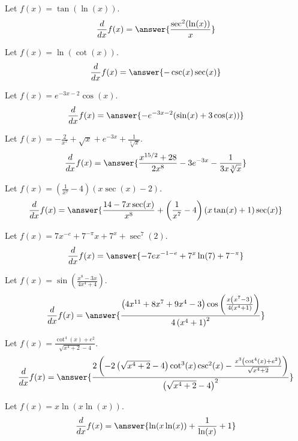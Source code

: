 \documentclass{ximera}
\begin{document}
\begin{shuffle}
\begin{exercise}
\begin{exercise}
Let $f(x)=\tan (\ln (x))$.
\[
\ddx f(x) = \answer{\frac{\sec ^2(\ln (x))}{x}}
\]
\end{exercise}

\begin{exercise}
Let $f(x)=\ln (\cot (x))$.
\[
\ddx f(x) = \answer{-\csc (x) \sec (x)}
\]
\end{exercise}

\begin{exercise}
Let $f(x)=e^{-3 x-2} \cos (x)$.
\[
\ddx f(x) = \answer{-e^{-3 x-2} (\sin (x)+3 \cos (x))}
\]
\end{exercise}

\begin{exercise}
Let $f(x)=-\frac{2}{x^7}+\sqrt{x}+e^{-3 x}+\frac{1}{\sqrt[3]{x}}$.
\[
\ddx f(x) = \answer{\frac{x^{15/2}+28}{2 x^8}-3 e^{-3 x}-\frac{1}{3 x \sqrt[3]{x}}}
\]
\end{exercise}

\begin{exercise}
Let $f(x)=\left(\frac{1}{x^7}-4\right) (x \sec (x)-2)$.
\[
\ddx f(x) = \answer{\frac{14-7 x \sec (x)}{x^8}+\left(\frac{1}{x^7}-4\right) (x \tan (x)+1) \sec (x)}
\]
\end{exercise}

\begin{exercise}
Let $f(x)=7 x^{-e}+7^{-\pi } x+7^x+\sec ^7(2)$.
\[
\ddx f(x) = \answer{-7 e x^{-1-e}+7^x \ln (7)+7^{-\pi }}
\]
\end{exercise}

\begin{exercise}
Let $f(x)=\sin \left(\frac{x^8-3 x}{4 x^4+4}\right)$.
\[
\ddx f(x) = \answer{\frac{\left(4 x^{11}+8 x^7+9 x^4-3\right) \cos \left(\frac{x \left(x^7-3\right)}{4 \left(x^4+1\right)}\right)}{4 \left(x^4+1\right)^2}}
\]
\end{exercise}

\begin{exercise}
Let $f(x)=\frac{\cot ^4(x)+e^2}{\sqrt{x^4+2}-4}$.
\[
\ddx f(x) = \answer{\frac{2 \left(-2 \left(\sqrt{x^4+2}-4\right) \cot ^3(x) \csc ^2(x)-\frac{x^3 \left(\cot ^4(x)+e^2\right)}{\sqrt{x^4+2}}\right)}{\left(\sqrt{x^4+2}-4\right)^2}}
\]
\end{exercise}

\begin{exercise}
Let $f(x)=x \ln (x \ln (x))$.
\[
\ddx f(x) = \answer{\ln (x \ln (x))+\frac{1}{\ln (x)}+1}
\]
\end{exercise}


\end{exercise}
\end{shuffle}
\end{document}
